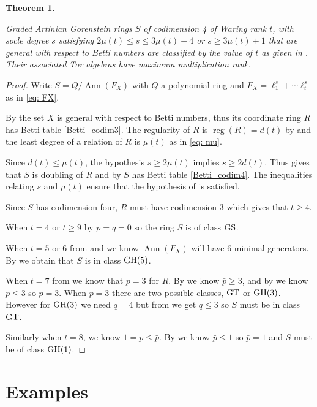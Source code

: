 \documentclass[reqno]{amsart}
\DeclareMathOperator{\Ann}{Ann}
\DeclareMathOperator{\reg}{reg}
\newcommand{\GT}{{\rm GT}}
\newcommand{\GH}{{\rm GH}}
\newcommand{\GS}{{\rm GS}}
\theoremstyle{plain} %
\newtheorem{theorem}{Theorem}[section] %
\theoremstyle{definition}
\theoremstyle{remark}
\begin{document}
\begin{theorem}\label{AG codepth 4}

 Graded Artinian Gorenstein  rings $S$ of codimension 4 of Waring  rank $t$, with socle degree $s$ satisfying 
$2\mu(t)\leq s\leq3\mu(t)-4$ or $s\geq3\mu(t)+1$
that are general with respect to Betti numbers are classified by the value of $t$ as given in . Their associated Tor algebras have maximum multiplication rank. 
\end{theorem}
\begin{proof}
 Write $S=Q/\Ann(F_X)$ with $Q$ a polynomial ring and $F_X=\ell_1^{s}+\cdots \ell_t^{s}$ as in \eqref{eq: FX}. 
 
By  the set $X$ is general with respect to Betti numbers, thus its coordinate ring $R $ has Betti table \eqref{Betti_codim3}. The regularity of $R$ is $\reg(R)=d(t)$ by \cite[Corollary 4.7]{EisenbudSyzygy} and the least degree of a relation of $R$ is $\mu(t)$ as in \eqref{eq: mu}. 

Since  $d(t)\leq \mu(t)$, the hypothesis $s\geq 2\mu(t)$ implies $s\geq 2d(t)$. Thus  gives that $S$ is doubling of $R$ and  by   $S$ has Betti table \eqref{Betti_codim4}. The inequalities relating $s$ and $\mu(t)$ ensure that the hypothesis of  is satisfied. 


Since $S$ has codimension four, $R$ must have codimension $3$ which gives that $t\geq 4$. 


When $t=4$ or $t\geq 9$ by  $\bar p =\bar q=0$ so the ring $S$ is of class $\GS$.


When $t=5$ or 6 from  and  we know $\Ann(F_X)$ will have $6$ minimal generators. By  we obtain that $S$ is in class $\GH(5)$.


When $t=7$ from  we know that $p=3$ for $R$. By  we know $\bar p\geq 3$, and by  we know $\bar p\leq 3$ so $\bar p=3$. When $\bar p=3$ there are two possible classes,  $\GT$ or $\GH(3)$. However for $\GH(3)$ we need $\bar q=4$ but from  we get $\bar q\leq 3$ so $S$ must be in class $\GT$.

Similarly when $t=8$, we know $1=p\leq \bar p$. By  we know $\bar p\leq 1$ so $\bar p=1$ and $S$ must be of class $\GH(1)$.  
\end{proof}


\section{Examples}
\end{document}
